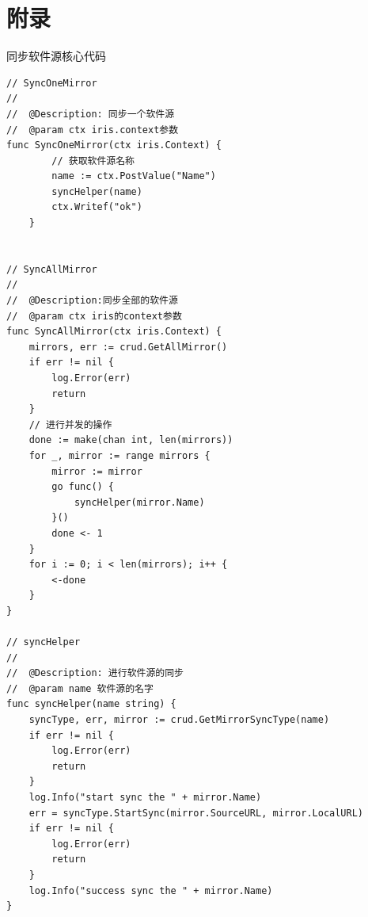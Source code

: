 \documentclass[supercite]{Experimental_Report}
\theoremstyle{definition}
\begin{document}
\section{附录}
同步软件源核心代码
\begin{lstlisting}
// SyncOneMirror
//
//	@Description: 同步一个软件源
//	@param ctx iris.context参数
func SyncOneMirror(ctx iris.Context) {
        // 获取软件源名称
        name := ctx.PostValue("Name")
        syncHelper(name)
        ctx.Writef("ok")
    }
    

// SyncAllMirror
//
//	@Description:同步全部的软件源
//	@param ctx iris的context参数
func SyncAllMirror(ctx iris.Context) {
	mirrors, err := crud.GetAllMirror()
	if err != nil {
		log.Error(err)
		return
	}
	// 进行并发的操作
	done := make(chan int, len(mirrors))
	for _, mirror := range mirrors {
		mirror := mirror
		go func() {
			syncHelper(mirror.Name)
		}()
		done <- 1
	}
	for i := 0; i < len(mirrors); i++ {
		<-done
	}
}

// syncHelper
//
//	@Description: 进行软件源的同步
//	@param name 软件源的名字
func syncHelper(name string) {
	syncType, err, mirror := crud.GetMirrorSyncType(name)
	if err != nil {
		log.Error(err)
		return
	}
	log.Info("start sync the " + mirror.Name)
	err = syncType.StartSync(mirror.SourceURL, mirror.LocalURL)
	if err != nil {
		log.Error(err)
		return
	}
	log.Info("success sync the " + mirror.Name)
}

\end{lstlisting}
\end{document}
